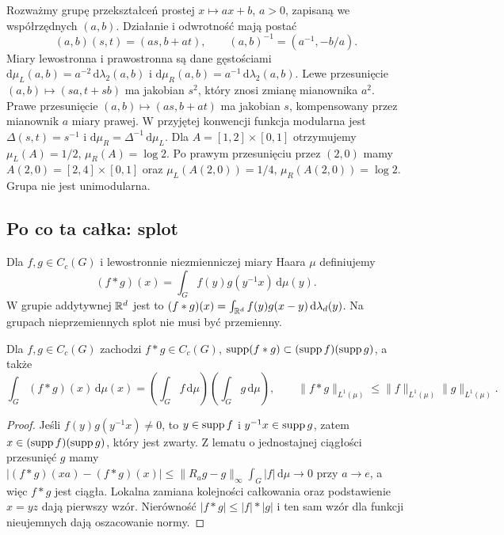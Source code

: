 \begin{przyklad}
Rozważmy grupę przekształceń prostej $x\mapsto ax+b$, $a>0$, zapisaną we współrzędnych $(a,b)$. Działanie i odwrotność mają postać
\[
(a,b)(s,t)=(as,b+at),\qquad (a,b)^{-1}=(a^{-1},-b/a).
\]
Miary lewostronna i prawostronna są dane gęstościami
$\mathrm d\mu_L(a,b)=a^{-2}\,\mathrm d\lambda_2(a,b)$ i $\mathrm d\mu_R(a,b)=a^{-1}\,\mathrm d\lambda_2(a,b)$.
Lewe przesunięcie $(a,b)\mapsto(sa,t+sb)$ ma jakobian $s^2$, który znosi zmianę mianownika $a^2$. Prawe przesunięcie $(a,b)\mapsto(as,b+at)$ ma jakobian $s$, kompensowany przez mianownik $a$ miary prawej. W przyjętej konwencji funkcja modularna jest $\Delta(s,t)=s^{-1}$ i $\mathrm d\mu_R=\Delta^{-1}\,\mathrm d\mu_L$. Dla $A=[1,2]\times[0,1]$ otrzymujemy $\mu_L(A)=1/2$, $\mu_R(A)=\log2$. Po prawym przesunięciu przez $(2,0)$ mamy $A(2,0)=[2,4]\times[0,1]$ oraz $\mu_L(A(2,0))=1/4$, $\mu_R(A(2,0))=\log2$. Grupa nie jest unimodularna.
\end{przyklad}

\subsection*{Po co ta całka: splot}
\begin{definicja}
Dla $f,g\in C_c(G)$ i lewostronnie niezmienniczej miary Haara $\mu$ definiujemy
\[
(f*g)(x)=\int_G f(y)g(y^{-1}x)\,\mathrm d\mu(y).
\]
W grupie addytywnej $\mathbb R^d$ jest to $(f*g)(x)=\int_{\mathbb R^d}f(y)g(x-y)\,\mathrm d\lambda_d(y)$. Na grupach nieprzemiennych splot nie musi być przemienny.
\end{definicja}
\begin{stwierdzenie}
Dla $f,g\in C_c(G)$ zachodzi $f*g\in C_c(G)$, $\operatorname{supp}(f*g)\subset(\operatorname{supp} f)(\operatorname{supp} g)$, a także
\[
\int_G(f*g)(x)\,\mathrm d\mu(x)=\left(\int_G f\,\mathrm d\mu\right)\left(\int_G g\,\mathrm d\mu\right),\qquad
\|f*g\|_{L^1(\mu)}\le\|f\|_{L^1(\mu)}\|g\|_{L^1(\mu)}.
\]
\end{stwierdzenie}
\begin{proof}
Jeśli $f(y)g(y^{-1}x)\ne0$, to $y\in\operatorname{supp} f$ i $y^{-1}x\in\operatorname{supp} g$, zatem $x\in(\operatorname{supp} f)(\operatorname{supp} g)$, który jest zwarty. Z lematu o jednostajnej ciągłości przesunięć $g$ mamy
$|(f*g)(xa)-(f*g)(x)|\le\|R_ag-g\|_\infty\int_G|f|\,\mathrm d\mu\to0$ przy $a\to e$, a więc $f*g$ jest ciągła. Lokalna zamiana kolejności całkowania oraz podstawienie $x=yz$ dają pierwszy wzór. Nierówność $|f*g|\le|f|*|g|$ i ten sam wzór dla funkcji nieujemnych dają oszacowanie normy.
\end{proof}
